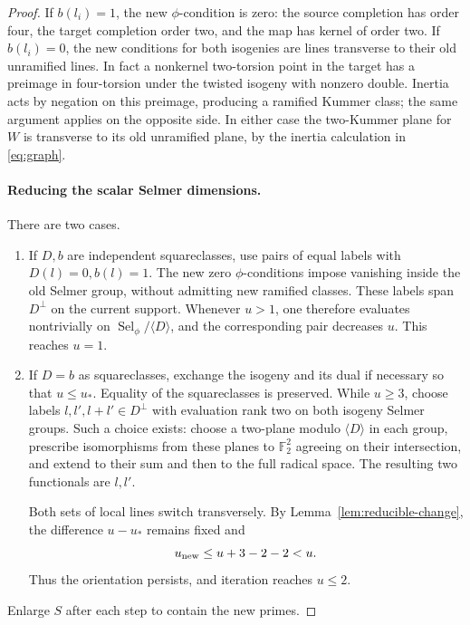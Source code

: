 \begin{proof}
If \(b(l_i)=1\), the new \(\phi\)-condition is zero: the source completion
has order four, the target completion order two, and the map has kernel
of order two.  If \(b(l_i)=0\), the new conditions for both isogenies are
lines transverse to their old unramified lines.  In fact a nonkernel
two-torsion point in the target has a preimage in four-torsion under the
twisted isogeny with nonzero double.  Inertia acts by negation on this
preimage, producing a ramified Kummer class; the same argument applies
on the opposite side.  In either case the two-Kummer plane for \(W\) is
transverse to its old unramified plane, by the inertia calculation in
\eqref{eq:graph}.

\paragraph{Reducing the scalar Selmer dimensions.}
There are two cases.
\begin{enumerate}[label=\textup{(\roman*)}]
\item If \(D,b\) are independent squareclasses, use pairs of equal labels
with \(D(l)=0,b(l)=1\).  The new zero \(\phi\)-conditions impose vanishing
inside the old Selmer group, without admitting new ramified classes.
These labels span \(D^\perp\) on the current support.  Whenever \(u>1\),
one therefore evaluates nontrivially on
\(\operatorname{Sel}_\phi/\langle D\rangle\), and the corresponding pair
decreases \(u\).  This reaches \(u=1\).
\item If \(D=b\) as squareclasses, exchange the isogeny and its dual if
necessary so that \(u\le u_*\).  Equality of the squareclasses is
preserved.  While \(u\ge3\), choose labels
\(l,l',l+l'\in D^\perp\) with evaluation rank two on both isogeny Selmer
groups.  Such a choice exists: choose a two-plane modulo
\(\langle D\rangle\) in each group, prescribe isomorphisms from these
planes to \(\mathbb F_2^2\) agreeing on their intersection, and extend to
their sum and then to the full radical space.  The resulting two
functionals are \(l,l'\).

Both sets of local lines switch transversely.  By
Lemma~\ref{lem:reducible-change}, the difference \(u-u_*\) remains fixed
and
\[
 u_{\rm new}\le u+3-2-2<u.
\]
Thus the orientation persists, and iteration reaches \(u\le2\).
\end{enumerate}
Enlarge \(S\) after each step to contain the new primes.


\end{proof}
